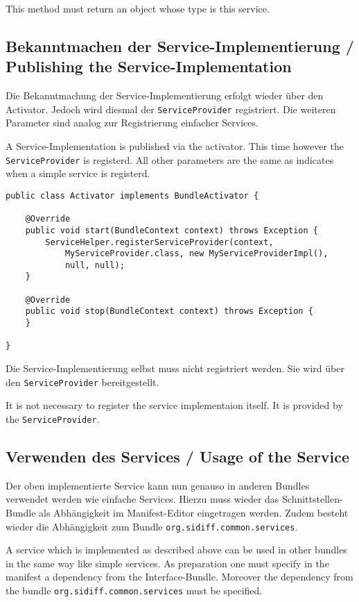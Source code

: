 \documentclass[10pt,a4paper]{scrartcl}
\providecommand{\deng}[2]{#1 / {\sffamily #2}}
\providecommand{\deutsch}[1]{#1}
\providecommand{\englisch}[1]{{\sffamily #1}}
\begin{document}
\englisch{This method must return an object whose type is this service.}


\subsection{\deng{Bekanntmachen der Service-Implementierung}{Publishing the Service-Implementation}}
\deutsch{Die Bekanntmachung der Service-Implementierung erfolgt wieder über den Activator.
Jedoch wird diesmal der \texttt{ServiceProvider} registriert. Die weiteren 
Parameter sind analog zur Registrierung einfacher Services.}

\englisch{A Service-Implementation is published via the activator. This time however the \texttt{ServiceProvider} is registerd. All other parameters are the same as indicates when a simple service is registerd.}

\begin{lstlisting}
public class Activator implements BundleActivator {

	@Override
	public void start(BundleContext context) throws Exception {
		ServiceHelper.registerServiceProvider(context,
			MyServiceProvider.class, new MyServiceProviderImpl(), 
			null, null);
	}

	@Override
	public void stop(BundleContext context) throws Exception {
	}

}
\end{lstlisting}
\deutsch{Die Service-Implementierung selbst muss nicht registriert werden. Sie wird über
den \texttt{ServiceProvider} bereitgestellt.}

\englisch{It is not necessary to register the service implementaion itself. It is provided by the \texttt{ServiceProvider}.}


\subsection{\deng{Verwenden des Services}{Usage of the Service}}
\deutsch{Der oben implementierte Service kann nun genauso in anderen Bundles verwendet
werden wie einfache Services. Hierzu muss wieder das Schnittstellen-Bundle als
Abhängigkeit im Manifest-Editor eingetragen werden. Zudem besteht wieder die
Abhängigkeit zum Bundle \texttt{org.sidiff.common.services}.}

\englisch{A service which is implemented as described above can be used in other bundles in the same way like simple services. As preparation one must specify in the manifest a dependency from the Interface-Bundle. Moreover the dependency from the bundle \texttt{org.sidiff.common.services} must be specified.}
\end{document}
